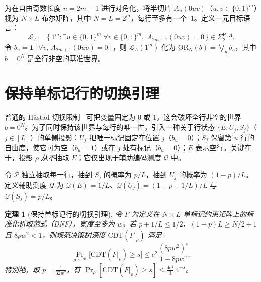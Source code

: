\documentclass[11pt,a4paper]{article}
\newtheorem{theorem}{定理}[section]
\theoremstyle{definition}
\theoremstyle{remark}
\newcommand{\SigTwo}{\Sigma_2^{\mathsf{P}}}
\newcommand{\CDT}{\mathrm{CDT}}
\newcommand{\OR}{\mathrm{OR}}
\newcommand{\Prb}{\Pr}
\begin{document}
为在自由奇数长度 $n=2m+1$ 进行对角化，将半切片 $A_n(0uv)$（$u,v\in\{0,1\}^m$）视为 $N\times L$ 布尔矩阵，其中 $N=L=2^m$，每行至多有一个~$1$。定义一元目标语言：
\[
  \mathcal{L}_A = \bigl\{\, 1^m : \exists u \in \{0,1\}^m\; \forall v \in \{0,1\}^m,\; A_{2m+1}(0uv) = 0 \,\bigr\} \in \SigTwo{}^{,A}.
\]
令 $b_u=\mathbf1[\forall v,\,A_{2m+1}(0uv)=0]$，则 $\mathcal L_A(1^m)$ 化为 $\OR_N(b)=\bigvee_u b_u$，其中 $b=0^N$ 是全行非空的基准世界。

\section{保持单标记行的切换引理}

普通的 H\aa stad 切换限制~\cite{Hastad1986} 可把变量固定为 $0$ 或 $1$，这会破坏全行非空的世界 $b=0^N$。为了同时保持该世界与每行的唯一性，引入一种关于行状态 $\{E,U_j,S_j\}$（$j\in[L]$）的单侧投影：$U_j$ 把唯一标记固定在位置 $j$（$b_u=0$）；$S_j$ 保留第 $u$ 行的自由度，使它可为空（$b_u=1$）或在 $j$ 处有标记（$b_u=0$）；$E$ 表示空行。关键在于，投影 $\rho$ \emph{从不}抽取 $E$；它仅出现于辅助编码测度 $\mathcal{Q}$ 中。

令 $\mathcal P$ 独立抽取每一行，抽到 $S_j$ 的概率为 $p/L$，抽到 $U_j$ 的概率为 $(1-p)/L$。定义辅助测度 $\mathcal Q$ 为 $\mathcal Q(E)=1/L$、$\mathcal Q(U_j)=(1-p-1/L)/L$ 与 $\mathcal Q(S_j)=p/L$。

\begin{theorem}[保持单标记行的切换引理]
\label{thm:singleton-switching}
令 $F$ 为定义在 $N\times L$ 单标记约束矩阵上的标准化析取范式（DNF），宽度至多为 $w$。若 $p+1/L\le1/2$、$(1-p)L\ge N/2+1$ 且 $8pw^2<1$，则规范决策树深度 $\CDT(F|_\rho)$ 满足
\[
  \Prb_{\rho \sim \mathcal{P}}\bigl[\CDT(F|_\rho) \ge s\bigr]
  \le e^2 \frac{(8pw^2)^s}{1 - 8pw^2}.
\]
特别地，取 $p=\frac1{32w^2}$，有 $\Prb_\rho[\CDT(F|_\rho)\ge s]\le\frac{4e^2}{3}\,4^{-s}$。
\end{theorem}
\end{document}
